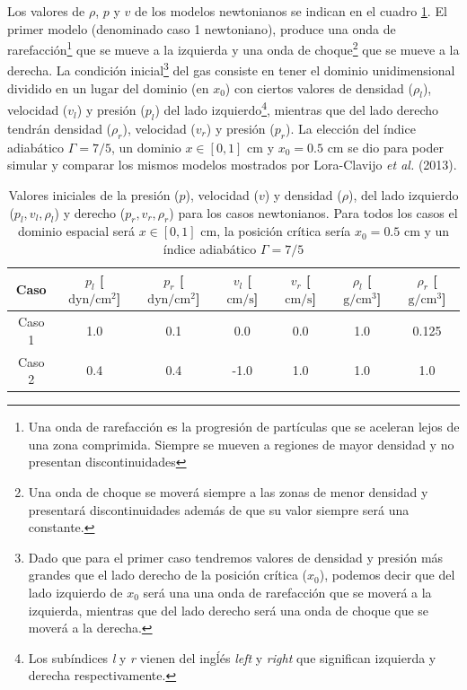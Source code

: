 \documentclass[12pt,a4paper]{book}
\begin{document}
Los valores de $\rho$, $p$ y $v$ de los modelos newtonianos se indican en el cuadro
\ref{Cuadro_parametros_sod_tube}. El primer  modelo (denominado caso 1 newtoniano), produce una onda 
de rarefacción\footnote{
  Una onda de rarefacción es la progresión de partículas que se aceleran lejos de una zona 
  comprimida. Siempre se mueven a regiones de mayor densidad y no presentan discontinuidades
} que se mueve a la izquierda y una onda de choque\footnote{
  Una onda de choque se moverá siempre a las zonas de menor densidad y presentará discontinuidades además
  de que su valor siempre será una constante.
} que se mueve a la derecha. La condición inicial\footnote{
  Dado que para el primer caso tendremos valores de densidad
  y presión más grandes que el lado derecho de la posición crítica ($x_0$), 
  podemos decir que del lado izquierdo 
  de $x_0$ será una una onda de rarefacción que se moverá a la izquierda, mientras que del lado
  derecho será una onda de choque que se moverá a la derecha.
} del gas consiste en tener el dominio 
unidimensional dividido en un lugar del dominio (en $x_0$) con ciertos valores de densidad ($\rho_l$), 
velocidad ($v_l$) y presión ($p_l$) del lado izquierdo\footnote{Los subíndices \emph{l} y \emph{r} 
vienen del ingĺés \emph{left} y \emph{right} que significan izquierda y derecha respectivamente.}, 
mientras que del lado derecho tendrán densidad ($\rho_r$), velocidad ($v_r$) y  presión ($p_r$). 
La elección del índice adiabático $\Gamma = 7/5$, un dominio $x \in [0,1]$ cm y $x_0 = 0.5$ cm 
se dio para poder simular y comparar los mismos modelos
mostrados por  Lora-Clavijo \emph{et al.} (2013).

\begin{table}[htbp]
  \begin{center}
  \begin{tabular}{|c|c|c|c|c|c|c|}
  \hline 
  \textbf{Caso} & \textbf{$p_l$} [$\text{dyn}/\text{cm}^2$] & \textbf{$p_r$} [$\text{dyn}/\text{cm}^2$]& \textbf{$v_l$} [$\text{cm}/\text{s}$]& \textbf{$v_r$} [$\text{cm}/\text{s}$]& \textbf{$\rho_l$} [$\text{g}/\text{cm}^3$]& \textbf{$\rho_r$} [$\text{g}/\text{cm}^3$] \\ 
  \hline 
  Caso 1 & 1.0  & 0.1  & 0.0 & 0.0 & 1.0  & 0.125 \\ 
  \hline 
  Caso 2 & 0.4  & 0.4  & -1.0 & 1.0 & 1.0  & 1.0  \\ 
  \hline 
  \end{tabular}
  \caption{\label{Cuadro_parametros_sod_tube} Valores iniciales de la presión ($p$), velocidad ($v$)
  y densidad ($\rho$), del lado izquierdo ($p_l, v_l, \rho_l$) y derecho ($p_r, v_r, \rho_r$)
  para los casos newtonianos. Para todos los
  casos el dominio espacial será $x \in [0,1]$ cm, la posición crítica sería
  $x_0 = 0.5$ cm y un índice adiabático $\Gamma = 7/5$}
  \end{center}
\end{table}
\end{document}
